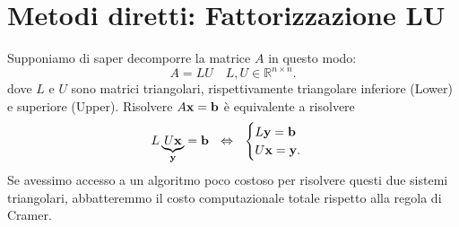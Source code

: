 \section{Metodi diretti: Fattorizzazione LU}
\label{sec:fattorizzazione-lu}

Supponiamo di saper decomporre la matrice $\displaystyle A$ in questo modo:
\begin{equation}
A=LU \quad L, U \in \mathbb{R}^{n\times n}.
\label{eq:fattorizzazione-LU}
\end{equation}
dove $\displaystyle L$ e $\displaystyle U$ sono matrici triangolari, rispettivamente triangolare inferiore (Lower) e superiore (Upper).
Risolvere $\displaystyle A\mathbf{x} =\mathbf{b}$ è equivalente a risolvere
\begin{equation*}
L\underbrace{U\x}_{\y} =\mathbf{b} \ \ \Leftrightarrow \ \ \begin{cases}
L\y =\mathbf{b}\\
U\x =\y.
\end{cases}
\end{equation*}
Se avessimo accesso a un algoritmo poco costoso per risolvere questi due sistemi triangolari, abbatteremmo il costo computazionale totale rispetto alla regola di Cramer.

